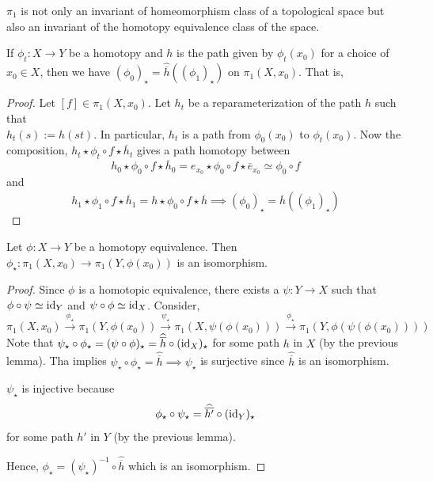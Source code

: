 \documentclass[12pt]{amsart}
\begin{document}
\begin{remark}
    $\pi_1$ is not only an invariant of homeomorphism class of a topological space but also an invariant of the homotopy equivalence class of the space. 
\end{remark}

\begin{lemma}
    If $\phi_t: X\to Y$ be a homotopy and $h$ is the path given by $\phi_t(x_0)$ for a choice of $x_0 \in X$, then we have $(\phi_0)_\star = \widehat{\overline{h}}((\phi_1)_\star)$ on $\pi_1(X, x_0)$. That is, 
    \begin{center}
    \end{center}
\end{lemma}

\begin{proof}
    Let $[f] \in \pi_1(X, x_0)$. Let $h_t$ be a reparameterization of the path $h$ such that \\ $h_t(s) := h(st)$. In particular, $h_t$ is a path from $\phi_0(x_0)$ to $\phi_t(x_0)$. Now the composition, $h_t \star \phi_t \circ f \star \overline{h}_t$ gives a path homotopy between 
    \[h_0 \star \phi_0 \circ f \star \overline{h}_0 = e_{x_0}\star \phi_0 \circ f \star \overline{e}_{x_0} \simeq \phi_0 \circ f\]
    and  
    \[h_1 \star \phi_1 \circ f \star \overline{h}_1 = h \star \phi_0 \circ f \star \overline{h} \implies (\phi_0)_\star = \widehat{\overline{h}}((\phi_1)_\star)\]
\end{proof}

\begin{theorem}
    Let $\phi: X \to Y$ be a homotopy equivalence. Then $\phi_\star: \pi_1(X, x_0) \to \pi_1(Y, \phi(x_0))$ is an isomorphism. 
\end{theorem}

\begin{proof}
    Since $\phi$ is a homotopic equivalence, there exists a $\psi: Y \to X$ such that $\phi \circ \psi \simeq \operatorname{id}_Y$ and $\psi \circ \phi \simeq \operatorname{id}_X$. Consider, 
    \[\pi_1(X, x_0) \xrightarrow{\phi_\star} \pi_1(Y, \phi(x_0)) \xrightarrow{\psi_\star} \pi_1(X, \psi(\phi(x_0))) \xrightarrow{\phi_\star} \pi_1(Y, \phi(\psi(\phi(x_0))))\]
    Note that $\psi_\star \circ \phi_\star = (\psi \circ \phi)_\star = \widehat{\overline{h}}\circ (\operatorname{id}_X)_\star$ for some path $h$ in $X$ (by the previous lemma). Tha implies  $ \psi_\star \circ \phi_\star = \widehat{\overline{h}} \implies \psi_\star$ is surjective since $\widehat{\overline{h}}$ is an isomorphism. 

    $\psi_\star$ is injective because 
    \[\phi_\star \circ \psi_\star = \widehat{\overline{h'}} \circ (\operatorname{id}_Y)_\star\] 
    for some path $h'$ in $Y$ (by the previous lemma). 

    Hence, $\phi_\star = (\psi_\star)^{-1} \circ \widehat{\overline{h}}$ which is an isomorphism. 
\end{proof}
\end{document}
